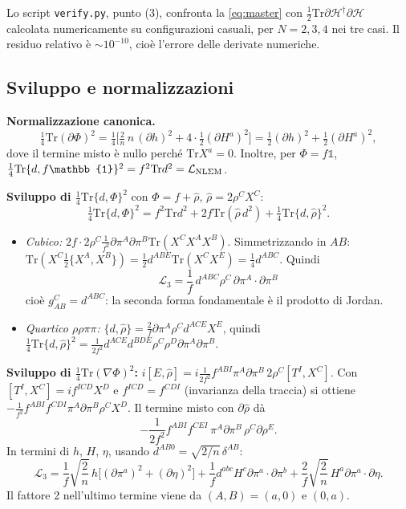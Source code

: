 \documentclass[11pt,a4paper]{article}
\numberwithin{equation}{section}
\theoremstyle{remark}
\newcommand{\Tr}{\mathrm{Tr}}
\newcommand{\Hf}{\mathcal{H}}
\newcommand{\one}{\mathbb{1}}
\begin{document}
\begin{verifica}
Lo script \texttt{verify.py}, punto (3), confronta la \eqref{eq:master} con $\frac12\Tr\partial\Hf^\dagger\partial\Hf$ calcolata numericamente su configurazioni casuali, per $N=2,3,4$ nei tre casi. Il residuo relativo è $\sim10^{-10}$, cioè l'errore delle derivate numeriche.
\end{verifica}

\subsection{Sviluppo e normalizzazioni}

\textbf{Normalizzazione canonica.}
\[
\tfrac14\Tr(\partial\Phi)^2=\tfrac14\Big[\tfrac2n\,n\,(\partial h)^2+4\cdot\tfrac12(\partial H^a)^2\Big]=\tfrac12(\partial h)^2+\tfrac12(\partial H^a)^2,
\]
dove il termine misto è nullo perché $\Tr X^a=0$. Inoltre, per $\Phi=f\one$, $\frac14\Tr\{d,f\one\}^2=f^2\Tr d^2=\mathcal L_{\rm NL\Sigma M}$. \checkmark

\textbf{Sviluppo di $\frac14\Tr\{d,\Phi\}^2$} con $\Phi=f+\hat\rho$, $\hat\rho=2\rho^CX^C$:
\[
\tfrac14\Tr\{d,\Phi\}^2=f^2\Tr d^2+2f\Tr(\hat\rho\,d^2)+\tfrac14\Tr\{d,\hat\rho\}^2 .
\]
\begin{itemize}
\item \emph{Cubico:} $2f\cdot2\rho^C\frac{1}{f^2}\partial\pi^A\partial\pi^B\Tr(X^CX^AX^B)$. Simmetrizzando in $AB$: $\Tr(X^C\tfrac12\{X^A,X^B\})=\frac12d^{ABE}\Tr(X^CX^E)=\frac14d^{ABC}$. Quindi
\begin{equation}
\boxed{\mathcal L_3=\frac1f\,d^{ABC}\rho^C\,\partial\pi^A\!\cdot\partial\pi^B}
\label{eq:L3}
\end{equation}
cioè $g^C_{AB}=d^{ABC}$: la seconda forma fondamentale è il prodotto di Jordan.
\item \emph{Quartico $\rho\rho\pi\pi$:} $\{d,\hat\rho\}=\frac2f\partial\pi^A\rho^Cd^{ACE}X^E$, quindi $\frac14\Tr\{d,\hat\rho\}^2=\frac{1}{2f^2}d^{ACE}d^{BDE}\rho^C\rho^D\partial\pi^A\partial\pi^B$.
\end{itemize}
\textbf{Sviluppo di $\frac14\Tr(\nabla\Phi)^2$:} $i[E,\hat\rho]=i\frac{1}{2f^2}f^{ABI}\pi^A\partial\pi^B\,2\rho^C[T^I,X^C]$. Con $[T^I,X^C]=if^{ICD}X^D$ e $f^{ICD}=f^{CDI}$ (invarianza della traccia) si ottiene $-\frac1{f^2}f^{ABI}f^{CDI}\pi^A\partial\pi^B\rho^CX^D$. Il termine misto con $\partial\hat\rho$ dà
\[
-\frac{1}{2f^2}f^{ABI}f^{CEI}\,\pi^A\partial\pi^B\,\rho^C\partial\rho^E .
\]
In termini di $h$, $H$, $\eta$, usando $d^{AB0}=\sqrt{2/n}\,\delta^{AB}$:
\begin{equation}
\mathcal L_3=\frac1f\sqrt{\frac2n}\,h\big[(\partial\pi^a)^2+(\partial\eta)^2\big]+\frac1fd^{abc}H^c\partial\pi^a\!\cdot\partial\pi^b+\frac2f\sqrt{\frac2n}\,H^a\partial\pi^a\!\cdot\partial\eta .
\end{equation}
Il fattore 2 nell'ultimo termine viene da $(A,B)=(a,0)$ e $(0,a)$.
\end{document}
